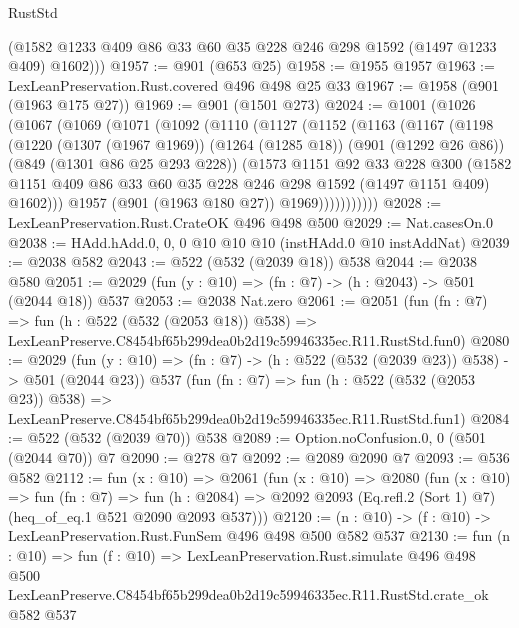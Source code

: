\begin{lexlean}{RustStd}
\begin{coremodule}
        (@1582 @1233 @409 @86 @33 @60 @35 @228 @246 @298 @1592 (@1497 @1233 @409) @1602)))
@1957 := @901 (@653 @25)
@1958 := @1955 @1957
@1963 := LexLeanPreservation.Rust.covered @496 @498 @25 @33
@1967 := @1958 (@901 (@1963 @175 @27))
@1969 := @901 (@1501 @273)
@2024 := @1001
    (@1026
      (@1067
        (@1069
          (@1071
            (@1092
              (@1110
                (@1127
                  (@1152
                    (@1163
                      (@1167
                        (@1198
                          (@1220
                            (@1307 (@1967 @1969))
                            (@1264 (@1285 @18))
                            (@901 (@1292 @26 @86))
                            (@849 (@1301 @86 @25 @293 @228))
                            (@1573
                              @1151
                              @92
                              @33
                              @228
                              @300
                              (@1582
                                @1151
                                @409
                                @86
                                @33
                                @60
                                @35
                                @228
                                @246
                                @298
                                @1592
                                (@1497 @1151 @409)
                                @1602)))
                          @1957
                          (@901 (@1963 @180 @27))
                          @1969)))))))))))
@2028 := LexLeanPreservation.Rust.CrateOK @496 @498 @500
@2029 := Nat.casesOn.{0}
@2038 := HAdd.hAdd.{0, 0, 0} @10 @10 @10 (instHAdd.{0} @10 instAddNat)
@2039 := @2038 @582
@2043 := @522 (@532 (@2039 @18)) @538
@2044 := @2038 @580
@2051 := @2029 (fun (y : @10) => (fn : @7) -> (h : @2043) -> @501 (@2044 @18)) @537
@2053 := @2038 Nat.zero
@2061 := @2051
    (fun (fn : @7) =>
    fun (h : @522 (@532 (@2053 @18)) @538) =>
    LexLeanPreserve.C8454bf65b299dea0b2d19c59946335ec.R11.RustStd.fun0)
@2080 := @2029
    (fun (y : @10) => (fn : @7) -> (h : @522 (@532 (@2039 @23)) @538) -> @501 (@2044 @23))
    @537
    (fun (fn : @7) =>
    fun (h : @522 (@532 (@2053 @23)) @538) =>
    LexLeanPreserve.C8454bf65b299dea0b2d19c59946335ec.R11.RustStd.fun1)
@2084 := @522 (@532 (@2039 @70)) @538
@2089 := Option.noConfusion.{0, 0} (@501 (@2044 @70)) @7
@2090 := @278 @7
@2092 := @2089 @2090 @7
@2093 := @536 @582
@2112 := fun (x : @10) =>
  @2061
    (fun (x : @10) =>
    @2080
      (fun (x : @10) =>
      fun (fn : @7) =>
      fun (h : @2084) =>
      @2092 @2093 (Eq.refl.{2} (Sort 1) @7) (heq_of_eq.{1} @521 @2090 @2093 @537)))
@2120 := (n : @10) -> (f : @10) -> LexLeanPreservation.Rust.FunSem @496 @498 @500 @582 @537
@2130 := fun (n : @10) =>
  fun (f : @10) =>
  LexLeanPreservation.Rust.simulate
    @496
    @498
    @500
    LexLeanPreserve.C8454bf65b299dea0b2d19c59946335ec.R11.RustStd.crate_ok
    @582
    @537
\end{coremodule}
\end{lexlean}
